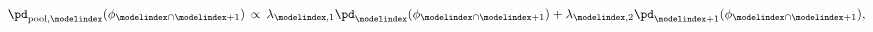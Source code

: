 \begin{equation}
  \pd_{\text{pool}, \modelindex}(\phi_{\modelindex \cap \modelindex + 1}) \, \propto \,
  \lambda_{\modelindex, 1}\pd_{\modelindex}(\phi_{\modelindex \cap \modelindex + 1}) +
  \lambda_{\modelindex, 2}\pd_{\modelindex + 1}(\phi_{\modelindex \cap \modelindex + 1}),
  \label{eqn:M-model-linear-pooling-one}
\end{equation}